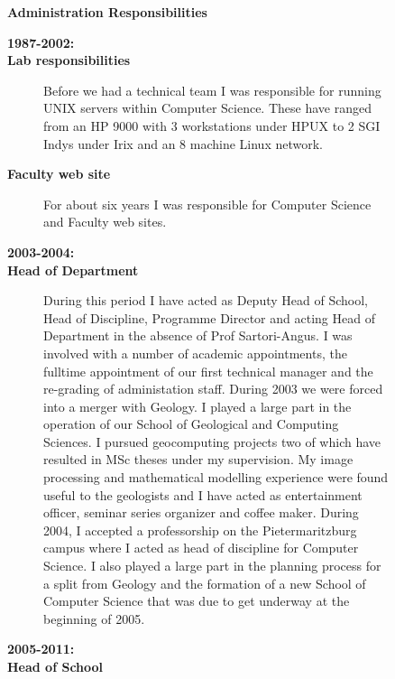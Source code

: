\begin{description}\item[] \begin{description}\item[] {\large \bf Administration Responsibilities  }
\begin{description}
\item[ {\bf 1987-2002:}]
\item[ {\bf Lab responsibilities} ]  Before we had a technical team 
                               I was responsible for
                               running UNIX servers within
                               Computer Science.  These have ranged from
                               an HP 9000 with 3 workstations under HPUX
                               to 2 SGI Indys under Irix and
                               an 8 machine Linux network.
\item[ {\bf  Faculty web site } ]  For about six years I was
     responsible for Computer Science and Faculty web sites. 
\item[ {\bf 2003-2004:}]
\item[ {\bf  Head of Department} ]
     During this period I have acted as Deputy Head of
     School, Head of Discipline, Programme Director 
     and acting Head of Department in the absence of
     Prof Sartori-Angus. 
     I was involved with a number of
     academic appointments, the fulltime appointment of our first
     technical manager and the re-grading of administation staff. \newline
     During 2003 we were forced into a merger with Geology. 
     I played a large part in the operation of our School
     of Geological and Computing Sciences.
     I pursued geocomputing projects
     two of which have resulted in MSc theses under my supervision.
     My image processing and mathematical modelling experience
     were found useful to the geologists and I have acted as entertainment officer, 
     seminar series organizer and coffee maker. \newline
     During 2004, I accepted a professorship on the Pietermaritzburg campus
     where  I acted as head of discipline for Computer Science.
     I also played a large part in the
     planning process for a split from Geology and the formation of a 
     new School of Computer Science that was
     due to get underway at the beginning of 2005.\newline
\item[ {\bf 2005-2011:}]
\item[ {\bf  Head of School} ]     

\end{description}
\end{description}
\end{description}
